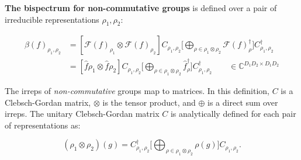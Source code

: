 \documentclass{article}
\begin{document}
\textbf{The bispectrum for non-commutative groups} is defined over a pair of irreducible representations $\rho_1, \rho_2$:

\begin{align*}
   \beta (f)_{\rho_1, \rho_2}
   &= [\mathcal{F}(f)_{\rho_1} \otimes \mathcal{F}(f)_{\rho_2}] C_{\rho_1,\rho_2} \Big[ \bigoplus_{\rho \in \rho_1 \otimes \rho_2} \mathcal{F}(f)_{\rho}^{\dagger} \Big] C^{\dagger}_{\rho_1,\rho_2}\\
   &= [\hat{f}{\rho_1} \otimes \hat{f}{\rho_2}] C_{\rho_1,\rho_2} \Big[ \bigoplus_{\rho \in \rho_1 \otimes \rho_2} \hat{f}_{\rho}^{\dagger} \Big] C^{\dagger}_{\rho_1,\rho_2} \qquad \in \mathbb{C}^{D_1 D_2 \times D_1 D_2}
    \label{eqn:non-commutative-bs}
\end{align*}

The irreps of \textit{non-commutative} groups map to matrices. In this definition, $C$ is a Clebsch-Gordan matrix, $\otimes$ is the tensor product, and $\oplus$ is a direct sum over irreps. The unitary Clebsch-Gordan matrix $C$ is analytically defined for each pair of representations as:

\begin{equation}
    (\rho_1 \otimes \rho_2)(g) = C_{\rho_1,\rho_2}^\dagger \Big[ \bigoplus_{\rho \in \rho_1 \otimes \rho_2} \rho(g) \Big] C_{\rho_1,\rho_2}.
    \label{eqn:non-commutative-bs}
\end{equation}
\end{document}

